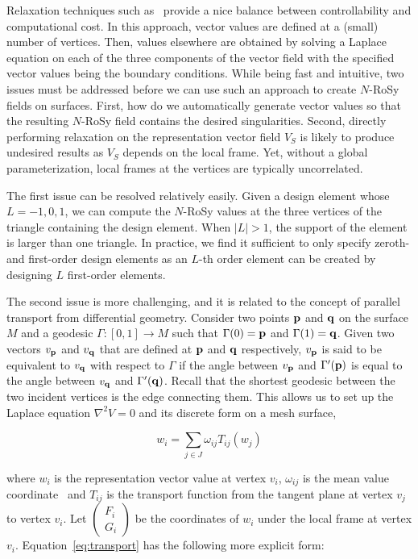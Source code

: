 \documentclass{acmsiggraph}               %
\begin{document}
Relaxation techniques such as~\cite{Turk:01,Wei:01} provide a nice
balance between controllability and computational cost. In this
approach, vector values are defined at a (small) number of vertices.
Then, values elsewhere are obtained by solving a Laplace equation on
each of the three components of the vector field with the specified
vector values being the boundary conditions. While being fast and
intuitive, two issues must be addressed before we can use such an
approach to create $N$-RoSy fields on surfaces. First, how do we
automatically generate vector values so that the resulting $N$-RoSy
field contains the desired singularities. Second, directly
performing relaxation on the representation vector field $V_S$ is
likely to produce undesired results as $V_S$ depends on the local
frame. Yet, without a global parameterization, local frames at the
vertices are typically uncorrelated.

The first issue can be resolved relatively easily. Given a design
element whose $L=-1,0,1$, we can compute the $N$-RoSy values at the
three vertices of the triangle containing the design element. When
$|L|>1$, the support of the element is larger than one triangle. In
practice, we find it sufficient to only specify zeroth- and
first-order design elements as an $L$-th order element can be
created by designing $L$ first-order elements.

The second issue is more challenging, and it is related to the
concept of parallel transport from differential geometry. Consider
two points ${\bf p}$ and ${\bf q}$ on the surface $M$ and a geodesic
$\Gamma: [0, 1] \rightarrow M$ such that $\Gamma(0) = {\bf p}$ and
$\Gamma(1) = {\bf q}$. Given two vectors $v_{\bf p}$ and $v_{\bf q}$
that are defined at ${\bf p}$ and ${\bf q}$ respectively, $v_{\bf
p}$ is said to be equivalent to $v_{\bf q}$ with respect to $\Gamma$
if the angle between $v_{\bf p}$ and $\Gamma'({\bf p})$ is equal to
the angle between $v_{\bf q}$ and $\Gamma'({\bf q})$. Recall that
the shortest geodesic between the two incident vertices is the edge
connecting them. This allows us to set up the Laplace equation
$\nabla^2 V = 0$ and its discrete form on a mesh surface,

\begin{equation}
w_i = \sum_{j \in J} \omega_{ij} T_{ij}(w_j) \label{eq:transport}
\end{equation}

\noindent where $w_i$ is the representation vector value at vertex
$v_i$, $\omega_{ij}$ is the mean value coordinate~\cite{Floater:03}
and $T_{ij}$ is the transport function from the tangent plane at
vertex $v_j$ to vertex $v_i$. Let $\begin{pmatrix} F_i \\ G_i
\end{pmatrix}$ be the coordinates of $w_i$ under the local frame at
vertex $v_i$. Equation~\ref{eq:transport} has the following more
explicit form:
\end{document}
